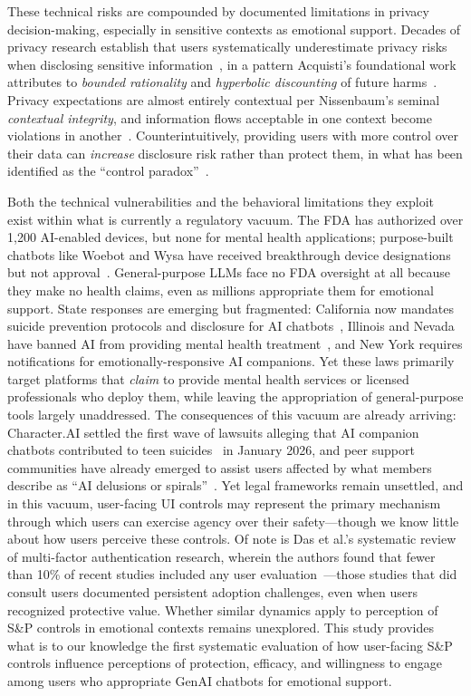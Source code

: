 \documentclass[letterpaper,twocolumn,10pt]{article}
\begin{document}
These technical risks are compounded by documented limitations in privacy decision-making, especially in sensitive contexts as emotional support. Decades of privacy research establish that users systematically underestimate privacy risks when disclosing sensitive information~\cite{acquisti2015privacy, norberg2007privacy, acquisti2005privacy}, in a pattern Acquisti's foundational work attributes to \textit{bounded rationality} and \textit{hyperbolic discounting} of future harms~\cite{acquisti2004privacy}. Privacy expectations are almost entirely contextual per Nissenbaum's seminal \textit{contextual integrity}, and information flows acceptable in one context become violations in another~\cite{nissenbaum2004contextual}. Counterintuitively, providing users with more control over their data can \textit{increase} disclosure risk rather than protect them, in what has been identified as the ``control paradox''~\cite{brandimarte2013misplaced}.

Both the technical vulnerabilities and the behavioral limitations they exploit exist within what is currently a regulatory vacuum. The FDA has authorized over 1,200 AI-enabled devices, but none for mental health applications; purpose-built chatbots like Woebot and Wysa have received breakthrough device designations but not approval~\cite{fdabreakthrough2022}. General-purpose LLMs face no FDA oversight at all because they make no health claims, even as millions appropriate them for emotional support. State responses are emerging but fragmented: California now mandates suicide prevention protocols and disclosure for AI chatbots~\cite{casb243}, Illinois and Nevada have banned AI from providing mental health treatment~\cite{illinoiswopr2025, nevadaab406}, and New York requires notifications for emotionally-responsive AI companions. Yet these laws primarily target platforms that \textit{claim} to provide mental health services or licensed professionals who deploy them, while leaving the appropriation of general-purpose tools largely unaddressed. The consequences of this vacuum are already arriving: Character.AI settled the first wave of lawsuits alleging that AI companion chatbots contributed to teen suicides~\cite{characterai2026settlement} in January 2026, and peer support communities have already emerged to assist users affected by what members describe as ``AI delusions or spirals''~\cite{npr2026humanline}. Yet legal frameworks remain unsettled, and in this vacuum, user-facing UI controls may represent the primary mechanism through which users can exercise agency over their safety---though we know little about how users perceive these controls. Of note is Das et al.'s systematic review of multi-factor authentication research, wherein the authors found that fewer than 10\% of recent studies included any user evaluation~\cite{das2019evaluating}---those studies that did consult users documented persistent adoption challenges, even when users recognized protective value. Whether similar dynamics apply to perception of S\&P controls in emotional contexts remains unexplored. This study provides what is to our knowledge the first systematic evaluation of how user-facing S\&P controls influence perceptions of protection, efficacy, and willingness to engage among users who appropriate GenAI chatbots for emotional support.
\end{document}
